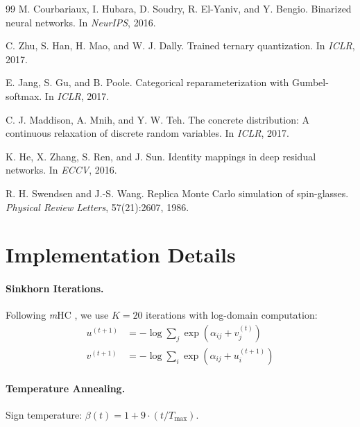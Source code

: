 \documentclass[Royal,times,sageh]{sagej}
\newcommand{\mHC}{\textit{m}HC}
\begin{document}
\begin{thebibliography}{99}
M. Courbariaux, I. Hubara, D. Soudry, R. El-Yaniv, and Y. Bengio.
\newblock Binarized neural networks.
\newblock In \textit{NeurIPS}, 2016.

C. Zhu, S. Han, H. Mao, and W. J. Dally.
\newblock Trained ternary quantization.
\newblock In \textit{ICLR}, 2017.

E. Jang, S. Gu, and B. Poole.
\newblock Categorical reparameterization with Gumbel-softmax.
\newblock In \textit{ICLR}, 2017.

C. J. Maddison, A. Mnih, and Y. W. Teh.
\newblock The concrete distribution: A continuous relaxation of discrete random variables.
\newblock In \textit{ICLR}, 2017.

K. He, X. Zhang, S. Ren, and J. Sun.
\newblock Identity mappings in deep residual networks.
\newblock In \textit{ECCV}, 2016.

R. H. Swendsen and J.-S. Wang.
\newblock Replica Monte Carlo simulation of spin-glasses.
\newblock \textit{Physical Review Letters}, 57(21):2607, 1986.

\end{thebibliography}

\appendix
\section{Implementation Details}

\paragraph{Sinkhorn Iterations.} Following \mHC{} \cite{xie2024mhc}, we use $K=20$ iterations with log-domain computation:
\begin{align}
    u^{(t+1)} &= -\log\sum_j \exp(\alpha_{ij} + v^{(t)}_j) \\
    v^{(t+1)} &= -\log\sum_i \exp(\alpha_{ij} + u^{(t+1)}_i)
\end{align}

\paragraph{Temperature Annealing.} Sign temperature: $\beta(t) = 1 + 9 \cdot (t / T_{\max})$.
\end{document}
